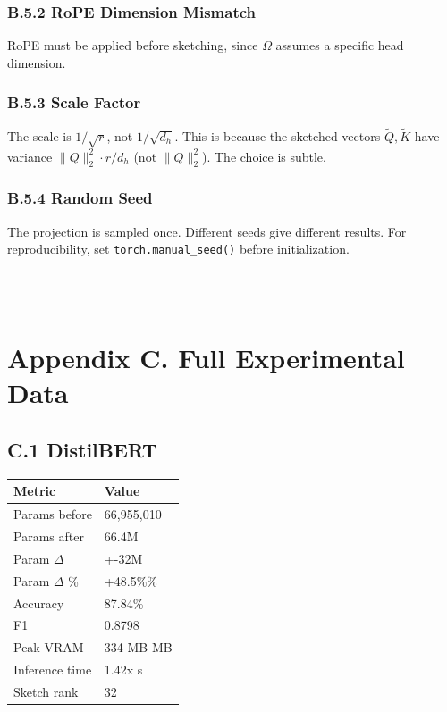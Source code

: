 \subsubsection{B.5.2 RoPE Dimension Mismatch}

RoPE must be applied before sketching, since $\Omega$ assumes a specific 
head dimension.

\subsubsection{B.5.3 Scale Factor}

The scale is $1/\sqrt{r}$, not $1/\sqrt{d_h}$. This is because the sketched 
vectors $\tilde{Q}, \tilde{K}$ have variance $\|Q\|_2^2 \cdot r / d_h$ (not 
$\|Q\|_2^2$). The choice is subtle.

\subsubsection{B.5.4 Random Seed}

The projection is sampled once. Different seeds give different results. 
For reproducibility, set \texttt{torch.manual\_seed()} before initialization.
\begin{lstlisting}

---
\end{lstlisting}


\section{Appendix C. Full Experimental Data}

\subsection{C.1 DistilBERT}

\begin{table}[H]
\centering
\small
\begin{tabular}{ll}
\toprule
\textbf{Metric} & \textbf{Value} \\
\midrule
Params before & 66,955,010 \\
Params after & 66.4M \\
Param $\Delta$ & +-32M \\
Param $\Delta$ \% & +48.5\%\% \\
Accuracy & 87.84\% \\
F1 & 0.8798 \\
Peak VRAM & 334 MB MB \\
Inference time & 1.42x s \\
Sketch rank & 32 \\
\bottomrule
\end{tabular}
\end{table}

